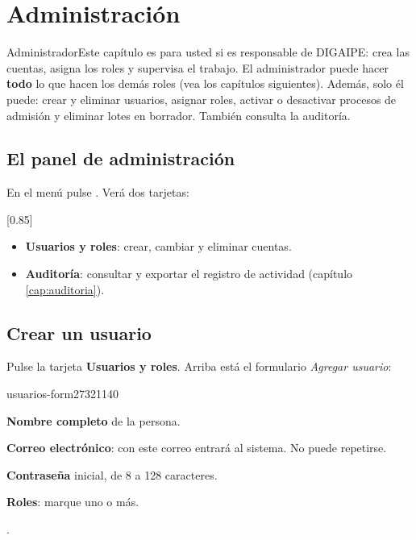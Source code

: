 \chapter{Administración}\label{cap:administracion}

\begin{ficharol}{Administrador}{Este capítulo es para usted si es responsable de DIGAIPE:
  crea las cuentas, asigna los roles y supervisa el trabajo.}
El administrador puede hacer \textbf{todo} lo que hacen los demás roles (vea los capítulos
siguientes). Además, solo él puede: crear y eliminar usuarios, asignar roles, activar o
desactivar procesos de admisión y eliminar lotes en borrador. También consulta la auditoría.
\end{ficharol}

\section{El panel de administración}

En el menú pulse . Verá dos tarjetas:

[0.85\linewidth]

\begin{itemize}
  \item \textbf{Usuarios y roles}: crear, cambiar y eliminar cuentas.
  \item \textbf{Auditoría}: consultar y exportar el registro de actividad (capítulo
        \ref{cap:auditoria}).
\end{itemize}

\section{Crear un usuario}

Pulse la tarjeta \textbf{Usuarios y roles}. Arriba está el formulario \emph{Agregar usuario}:

\begin{captura}{usuarios-form}{2732}{1140}
\end{captura}

\begin{leyenda}
  \item[1] \textbf{Nombre completo} de la persona.
  \item[2] \textbf{Correo electrónico}: con este correo entrará al sistema. No puede repetirse.
  \item[3] \textbf{Contraseña} inicial, de 8 a 128 caracteres.
  \item[4] \textbf{Roles}: marque uno o más.
  \item[5] .
\end{leyenda}


